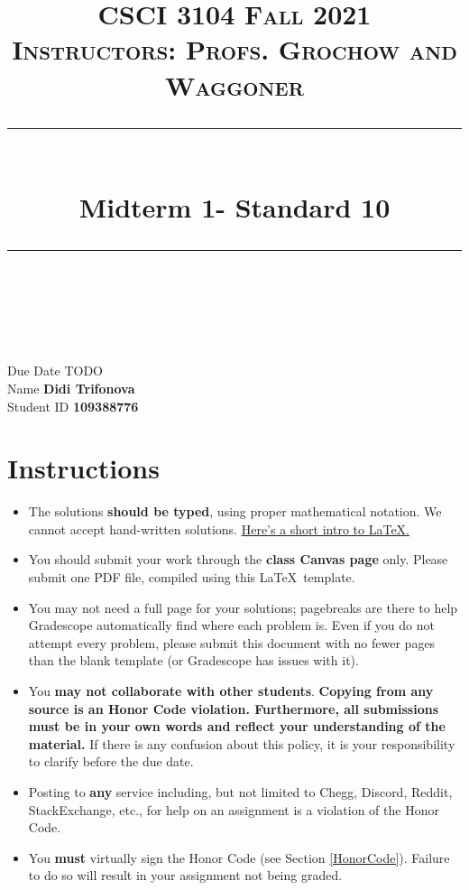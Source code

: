 \documentclass[11pt]{article}
\title{
\normalfont \normalsize 
\textsc{CSCI 3104 Fall 2021 \\ 
Instructors: Profs. Grochow and Waggoner} \\
[10pt] 
\rule{\linewidth}{0.5pt} \\[6pt] 
\huge Midterm 1- Standard 10 \\
\rule{\linewidth}{2pt}  \\[10pt]
}
\date{}
\theoremstyle{definition}
\theoremstyle{definition}
\theoremstyle{definition}
\begin{document}

\maketitle


\noindent
Due Date \dotfill TODO \\
Name \dotfill \textbf{Didi Trifonova} \\
Student ID \dotfill \textbf{109388776} \\


\tableofcontents

\section{Instructions}
 \begin{itemize}
	\item The solutions \textbf{should be typed}, using proper mathematical notation. We cannot accept hand-written solutions. \href{http://ece.uprm.edu/~caceros/latex/introduction.pdf}{Here's a short intro to \LaTeX.}
	\item You should submit your work through the \textbf{class Canvas page} only. Please submit one PDF file, compiled using this \LaTeX \ template.
	\item You may not need a full page for your solutions; pagebreaks are there to help Gradescope automatically find where each problem is. Even if you do not attempt every problem, please submit this document with no fewer pages than the blank template (or Gradescope has issues with it).

	\item You \textbf{may not collaborate with other students}. \textbf{Copying from any source is an Honor Code violation. Furthermore, all submissions must be in your own words and reflect your understanding of the material.} If there is any confusion about this policy, it is your responsibility to clarify before the due date. 

	\item Posting to \textbf{any} service including, but not limited to Chegg, Discord, Reddit, StackExchange, etc., for help on an assignment is a violation of the Honor Code.

	\item You \textbf{must} virtually sign the Honor Code (see Section \ref{HonorCode}). Failure to do so will result in your assignment not being graded.
\end{itemize}
\end{document}

